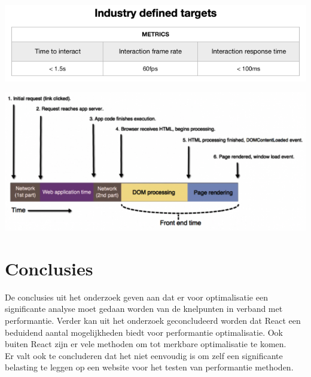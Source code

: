 \documentclass[a0,portrait]{a0poster}
\begin{document}
\begin{multicols}{2}
\begin{center}\vspace{1cm}
\includegraphics[width=1.0\linewidth]{InteractionSpeedTarget}
\end{center}\vspace{1cm}

\begin{center}\vspace{1cm}
    \includegraphics[width=1.0\linewidth]{BrowserPageLoadTimeline}
\end{center}\vspace{1cm}


\color{HoGentAccent1} 
\section*{Conclusies}
\color{black}

De conclusies uit het onderzoek geven aan dat er voor optimalisatie een significante analyse moet gedaan worden van de knelpunten in verband met performantie. Verder kan uit het onderzoek geconcludeerd worden dat React een beduidend aantal mogelijkheden biedt voor performantie optimalisatie. Ook buiten React zijn er vele methoden om tot merkbare optimalisatie te komen. \\
Er valt ook te concluderen dat het niet eenvoudig is om zelf een significante belasting te leggen op een website voor het testen van performantie methoden.


\end{multicols}
\end{document}

